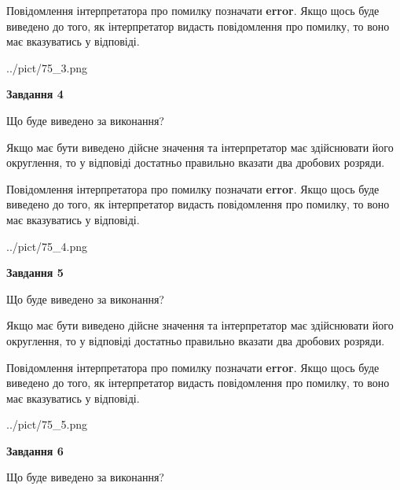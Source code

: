 \documentclass[12pt, ukrainian]{article}
\begin{document}
{\begin {Large}
Повідомлення інтерпретатора про помилку позначати \textbf{error}.
Якщо щось буде виведено до того, як інтерпретатор видасть повідомлення про помилку, 
то воно має вказуватись у відповіді. \par

\begin{center}
	{../pict/75_3.png}
\end{center}
\newpage

{\begin {center}\textbf{Завдання 4}\end {center}}\par
Що буде виведено за виконання? \par

Якщо має бути виведено дійсне значення та інтерпретатор має здійснювати його округлення, 
то у відповіді достатньо правильно вказати два дробових розряди.

Повідомлення інтерпретатора про помилку позначати \textbf{error}.
Якщо щось буде виведено до того, як інтерпретатор видасть повідомлення про помилку, 
то воно має вказуватись у відповіді. \par

\begin{center}
	{../pict/75_4.png}
\end{center}
\newpage

{\begin {center}\textbf{Завдання 5}\end {center}}\par
Що буде виведено за виконання? \par

Якщо має бути виведено дійсне значення та інтерпретатор має здійснювати його округлення, 
то у відповіді достатньо правильно вказати два дробових розряди.

Повідомлення інтерпретатора про помилку позначати \textbf{error}.
Якщо щось буде виведено до того, як інтерпретатор видасть повідомлення про помилку, 
то воно має вказуватись у відповіді. \par

\begin{center}
	{../pict/75_5.png}
\end{center}
\newpage

{\begin {center}\textbf{Завдання 6}\end {center}}\par
Що буде виведено за виконання? \par


\end{Large}}
\end{document}
